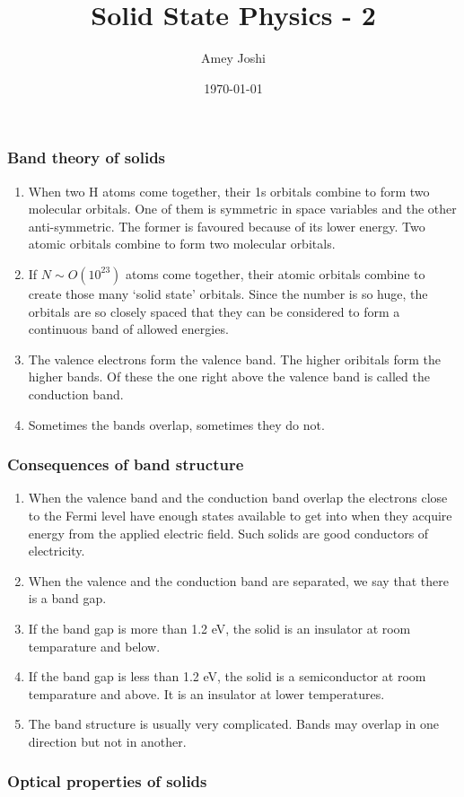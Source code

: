 \documentclass{beamer}
\title{Solid State Physics - 2}
\author{Amey Joshi}
\date{\today}
\begin{document}
\begin{frame}
\titlepage
\end{frame}

\begin{frame}
\frametitle{Band theory of solids}
\begin{enumerate}
\item When two H atoms come together, their 1s orbitals combine to form two 
molecular orbitals. One of them is symmetric in space variables and the other
anti-symmetric. The former is favoured because of its lower energy. Two atomic
orbitals combine to form two molecular orbitals.
\item If $N \sim O(10^{23})$ atoms come together, their atomic orbitals combine
to create those many `solid state' orbitals. Since the number is so huge, the 
orbitals are so closely spaced that they can be considered to form a continuous
band of allowed energies.
\item The valence electrons form the valence band. The higher oribitals form the
higher bands. Of these the one right above the valence band is called the 
conduction band.
\item Sometimes the bands overlap, sometimes they do not.
\end{enumerate}
\end{frame}

\begin{frame}
\frametitle{Consequences of band structure}
\begin{enumerate}
\item When the valence band and the conduction band overlap the electrons close
to the Fermi level have enough states available to get into when they acquire
energy from the applied electric field. Such solids are good conductors of 
electricity.
\item When the valence and the conduction band are separated, we say that there
is a band gap.
\item If the band gap is more than 1.2 eV, the solid is an insulator at room
temparature and below.
\item If the band gap is less than 1.2 eV, the solid is a semiconductor at room
temparature and above. It is an insulator at lower temperatures.
\item The band structure is usually very complicated. Bands may overlap in one
direction but not in another.
\end{enumerate}
\end{frame}

\begin{frame}
\frametitle{Optical properties of solids}
\end{frame}
\end{document}
